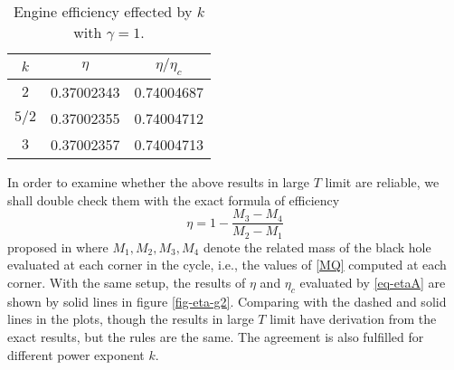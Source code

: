 \documentclass[preprint,showpacs,showkeys,onecolumn,nofootinbib]{revtex4}
\begin{document}
\begin{widetext}
\begin{table}[h]
\begin{center}
\begin{tabular}{|c|c|c|}
 \hline
$k$&$\eta$ &$\eta/\eta_c $  \\  \hline
$2$&0.37002343 & 0.74004687  \\  \hline
$5/2$ &0.37002355 &0.74004712   \\ \hline
$3$&0.37002357 &0.74004713   \\ \hline
 \end{tabular}
 \caption{\label{table1}Engine efficiency effected by $k$ with $\gamma=1$.}
 \end{center}
\end{table}
\end{widetext}

In order to examine whether the above results in large $T$ limit are reliable, we  shall double
check them with the exact formula of efficiency
\begin{equation}\label{eq-etaA}
\eta=1-\frac{M_3-M_4}{M_2-M_1}
\end{equation}
proposed in \cite{Johnson:2016pfa} where $M_1,M_2,M_3,M_4$ denote the related mass of the black hole evaluated at each  corner in the cycle, i.e.,  the values of \eqref{MQ}
computed at each corner. With the same setup, the results of $\eta$ and $\eta_c$ evaluated by \eqref{eq-etaA} are shown by solid lines in figure \ref{fig-eta-g2}. Comparing with the dashed and solid lines in the plots, though the results in large $T$ limit have derivation from the exact results, but the rules are the same. The agreement is also fulfilled for different power exponent $k$.
\end{document}
